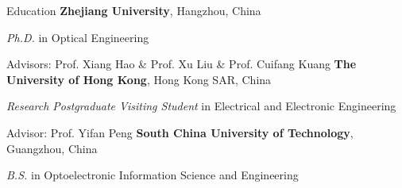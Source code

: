 \begin{rubric}{Education}
	\entry*[2018/09 -- 2023/12]%
	\textbf{Zhejiang University}, Hangzhou, China
	\par \textit{Ph.D.} in Optical Engineering
	\par Advisors: Prof. Xiang Hao \& Prof. Xu Liu \& Prof. Cuifang Kuang
	\entry*[2022/12 -- 2023/03]%
	\textbf{The University of Hong Kong}, Hong Kong SAR, China
	\par \textit{Research Postgraduate Visiting Student} in Electrical and Electronic Engineering
	\par Advisor: Prof. Yifan Peng
	\entry*[2014/09 -- 2018/06]%
	\textbf{South China University of Technology}, Guangzhou, China
	\par \textit{B.S.} in Optoelectronic Information Science and Engineering
\end{rubric}